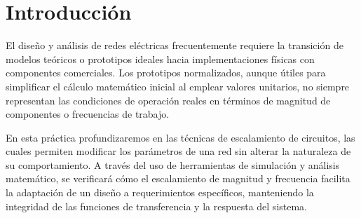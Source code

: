 \section{Introducción}
El diseño y análisis de redes eléctricas frecuentemente requiere la transición de modelos teóricos o prototipos ideales hacia implementaciones físicas con componentes comerciales. Los prototipos normalizados, aunque útiles para simplificar el cálculo matemático inicial al emplear valores unitarios, no siempre representan las condiciones de operación reales en términos de magnitud de componentes o frecuencias de trabajo.

En esta práctica profundizaremos en las técnicas de escalamiento de circuitos, las cuales permiten modificar los parámetros de una red sin alterar la naturaleza de su comportamiento. A través del uso de herramientas de simulación y análisis matemático, se verificará cómo el escalamiento de magnitud y frecuencia facilita la adaptación de un diseño a requerimientos específicos, manteniendo la integridad de las funciones de transferencia y la respuesta del sistema.

